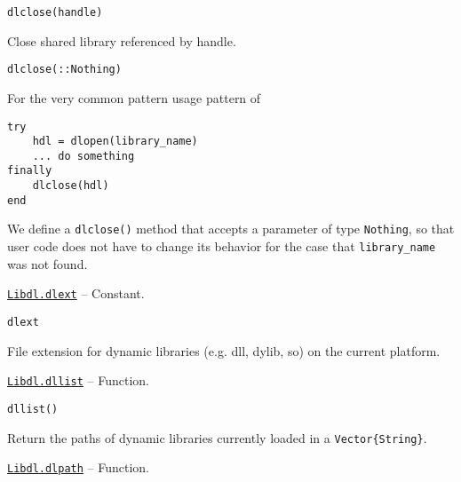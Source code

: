 \begin{adjustwidth}{2em}{0pt}


\begin{verbatim}
dlclose(handle)
\end{verbatim}

Close shared library referenced by handle.




\begin{lstlisting}
dlclose(::Nothing)
\end{lstlisting}

For the very common pattern usage pattern of


\begin{lstlisting}
try
    hdl = dlopen(library_name)
    ... do something
finally
    dlclose(hdl)
end
\end{lstlisting}

We define a \texttt{dlclose()} method that accepts a parameter of type \texttt{Nothing}, so that user code does not have to change its behavior for the case that \texttt{library\_name} was not found.



\end{adjustwidth}
\hypertarget{8833400024976878033}{} 
\hyperlink{8833400024976878033}{\texttt{Libdl.dlext}}  -- {Constant.}

\begin{adjustwidth}{2em}{0pt}


\begin{verbatim}
dlext
\end{verbatim}

File extension for dynamic libraries (e.g. dll, dylib, so) on the current platform.



\end{adjustwidth}
\hypertarget{106077495372504799}{} 
\hyperlink{106077495372504799}{\texttt{Libdl.dllist}}  -- {Function.}

\begin{adjustwidth}{2em}{0pt}


\begin{verbatim}
dllist()
\end{verbatim}

Return the paths of dynamic libraries currently loaded in a \texttt{Vector\{String\}}.



\end{adjustwidth}
\hypertarget{6289250176059967308}{} 
\hyperlink{6289250176059967308}{\texttt{Libdl.dlpath}}  -- {Function.}

